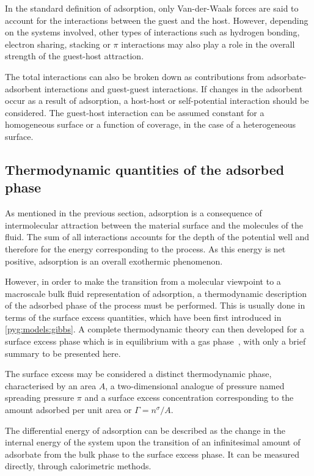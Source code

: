 In the standard definition of adsorption, only
Van-der-Waals forces are said to account for the interactions between
the guest and the host. However, depending on the
systems involved, other types of interactions such
as hydrogen bonding, electron sharing, stacking or \( \pi \) interactions
may also play a role in the overall strength of the guest-host
attraction.

The total interactions can also be broken down as contributions
from adsorbate-adsorbent interactions and guest-guest interactions.
If changes in the adsorbent occur as a result of adsorption,
a host-host or self-potential interaction should be considered.
The guest-host interaction can be assumed constant for a homogeneous
surface or a function of coverage, in the case of a
heterogeneous surface.

\subsection{Thermodynamic quantities of the adsorbed phase}

As mentioned in the previous section, adsorption
is a consequence of intermolecular attraction between the
material surface and the molecules of the fluid. The sum of
all interactions accounts for the depth of the potential
well and therefore for the energy corresponding to the
process. As this energy is net positive, adsorption is an
overall exothermic phenomenon.

However, in order to make the transition from a molecular
viewpoint to a macroscale bulk fluid representation of
adsorption, a thermodynamic description of the adsorbed
phase of the process must be performed. This is usually 
done in terms of the surface excess quantities, which 
have been first introduced in \autoref{pyg:models:gibbs}.
A complete thermodynamic theory can then developed for a surface 
excess phase which is in equilibrium with a gas 
phase~\cite{rouquerolAdsorptionPowdersPorous2013}, with only
a brief summary to be presented here.

The surface excess may be considered a distinct thermodynamic phase, 
characterised by an area \(A\), a two-dimensional analogue of 
pressure named spreading pressure \(\pi\) and a surface excess 
concentration corresponding to the amount adsorbed per unit
area or \(\Gamma = n^{\sigma}/A\).

The differential energy of adsorption can be described as the 
change in the internal energy of the system upon the transition
of an infinitesimal amount of adsorbate from the bulk phase
to the surface excess phase. It can be measured directly, through
calorimetric methods.

